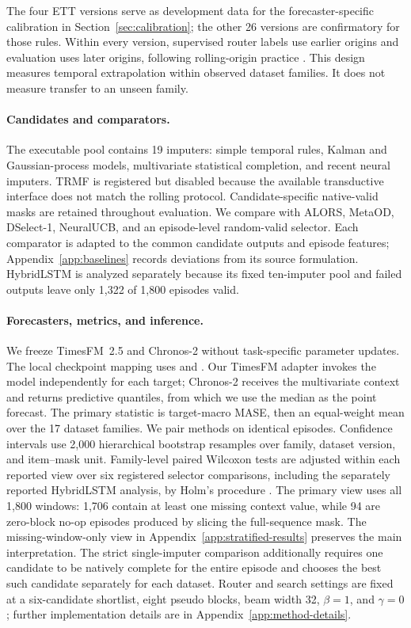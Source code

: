 \documentclass{article}
\begin{document}
The four ETT versions serve as development data for the forecaster-specific calibration in Section~\ref{sec:calibration}; the other 26 versions are confirmatory for those rules. Within every version, supervised router labels use earlier origins and evaluation uses later origins, following rolling-origin practice \citep{tashman2000outofsample}. This design measures temporal extrapolation within observed dataset families. It does not measure transfer to an unseen family.

\paragraph{Candidates and comparators.}
The executable pool contains 19 imputers: simple temporal rules, Kalman and Gaussian-process models, multivariate statistical completion, and recent neural imputers. TRMF is registered but disabled because the available transductive interface does not match the rolling protocol. Candidate-specific native-valid masks are retained throughout evaluation. We compare with ALORS, MetaOD, DSelect-1, NeuralUCB, and an episode-level random-valid selector. Each comparator is adapted to the common candidate outputs and episode features; Appendix~\ref{app:baselines} records deviations from its source formulation. HybridLSTM is analyzed separately because its fixed ten-imputer pool and failed outputs leave only 1,322 of 1,800 episodes valid.

\paragraph{Forecasters, metrics, and inference.}
We freeze TimesFM~2.5 and Chronos-2 without task-specific parameter updates. The local checkpoint mapping uses  \citep{google2025timesfm25} and  \citep{ansari2025chronos2}. Our TimesFM adapter invokes the model independently for each target; Chronos-2 receives the multivariate context and returns predictive quantiles, from which we use the median as the point forecast. The primary statistic is target-macro MASE, then an equal-weight mean over the 17 dataset families. We pair methods on identical episodes. Confidence intervals use 2,000 hierarchical bootstrap resamples over family, dataset version, and item--mask unit. Family-level paired Wilcoxon tests are adjusted within each reported view over six registered selector comparisons, including the separately reported HybridLSTM analysis, by Holm's procedure \citep{holm1979simple}. The primary view uses all 1,800 windows: 1,706 contain at least one missing context value, while 94 are zero-block no-op episodes produced by slicing the full-sequence mask. The missing-window-only view in Appendix~\ref{app:stratified-results} preserves the main interpretation. The strict single-imputer comparison additionally requires one candidate to be natively complete for the entire episode and chooses the best such candidate separately for each dataset. Router and search settings are fixed at a six-candidate shortlist, eight pseudo blocks, beam width 32, $\beta=1$, and $\gamma=0$; further implementation details are in Appendix~\ref{app:method-details}.
\end{document}
